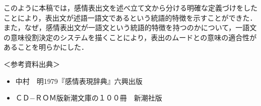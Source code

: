 このように本稿では，感情表出文を述べ立て文から分ける明確な定義づけをした
ことにより，表出文が述語一語文であるという統語的特徴を示すことができた．
また，なぜ，感情表出文が一語文という統語的特徴を持つのかについて，一語文
の意味役割決定のシステムを描くことにより，表出のムードとの意味の適合性が
あることを明らかにした．

\vspace{1.0cm}
\begin{flushleft}
＜参考資料出典＞
\end{flushleft}
\begin{itemize}
 \item[] 中村　明1979『感情表現辞典』六興出版
 \item[] ＣＤ−ＲＯＭ版新潮文庫の１００冊　新潮社版
\end{itemize}

\newpage









\begin{biography}


\end{biography}


